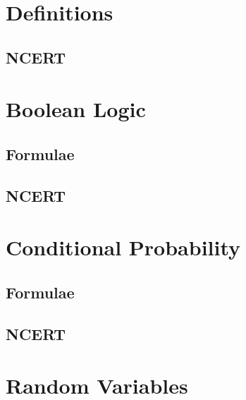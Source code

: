 \documentclass[journal]{IEEEtran}
\begin{document}
\newpage

\tableofcontents

\newpage


\renewcommand{\thetable}{\theenumi}

\section{Definitions}
\subsection{NCERT}

\section{Boolean Logic}
\subsection{Formulae}

\subsection{NCERT}


\newpage
\section{Conditional Probability}
\subsection{Formulae}

\subsection{NCERT}


\section{Random Variables}
\end{document}
